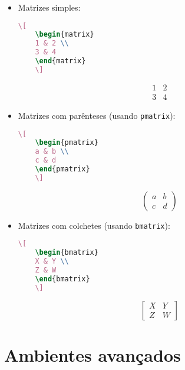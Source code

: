 \begin{itemize}
    \item Matrizes simples:
    \begin{lstlisting}[language=tex, caption=Matriz simples]
    \[
    \begin{matrix}
    1 & 2 \\
    3 & 4
    \end{matrix}
    \]
    \end{lstlisting}
    \[
    \begin{matrix}
    1 & 2 \\
    3 & 4
    \end{matrix}
    \]

    \item Matrizes com parênteses (usando \verb|pmatrix|):
    \begin{lstlisting}[language=tex, caption=Matriz com parênteses]
    \[
    \begin{pmatrix}
    a & b \\
    c & d
    \end{pmatrix}
    \]
    \end{lstlisting}
    \[
    \begin{pmatrix}
    a & b \\
    c & d
    \end{pmatrix}
    \]    

    \item Matrizes com colchetes (usando \verb|bmatrix|):
    \begin{lstlisting}[language=tex, caption=Matriz com colchetes]
    \[
    \begin{bmatrix}
    X & Y \\
    Z & W
    \end{bmatrix}
    \]
    \end{lstlisting}
    \[
    \begin{bmatrix}
    X & Y \\
    Z & W
    \end{bmatrix}
    \] 
\end{itemize}

\section{Ambientes avançados}

